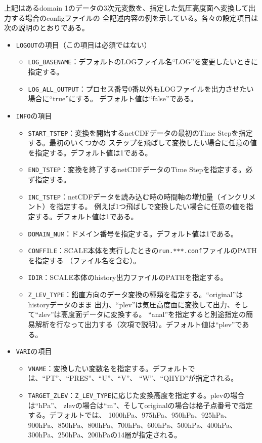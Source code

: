 \noindent 上記はあるdomain 1のデータの3次元変数を、指定した気圧高度面へ変換して出力する場合のconfigファイルの
全記述内容の例を示している。各々の設定項目は次の説明のとおりである。
\begin{itemize}
 \item \verb|LOGOUT|の項目（この項目は必須ではない）
 \begin{itemize}
  \item \verb|LOG_BASENAME|：デフォルトのLOGファイル名``LOG''を変更したいときに指定する。
  \item \verb|LOG_ALL_OUTPUT|：プロセス番号0番以外もLOGファイルを出力させたい場合に``true''にする。
        デフォルト値は``false''である。
 \end{itemize}
 \item \verb|INFO|の項目
 \begin{itemize}
  \item \verb|START_TSTEP|：変換を開始するnetCDFデータの最初のTime Stepを指定する。最初のいくつかの
        ステップを飛ばして変換したい場合に任意の値を指定する。デフォルト値は1である。
  \item \verb|END_TSTEP|：変換を終了するnetCDFデータのTime Stepを指定する。必ず指定する。
  \item \verb|INC_TSTEP|：netCDFデータを読み込む時の時間軸の増加量（インクリメント）を指定する。
        例えば1つ飛ばしで変換したい場合に任意の値を指定する。デフォルト値は1である。
  \item \verb|DOMAIN_NUM|：ドメイン番号を指定する。デフォルト値は1である。
  \item \verb|CONFFILE|：SCALE本体を実行したときの\verb|run.***.conf|ファイルのPATHを指定する
        （ファイル名を含む）。
  \item \verb|IDIR|：SCALE本体のhistory出力ファイルのPATHを指定する。
  \item \verb|Z_LEV_TYPE|：鉛直方向のデータ変換の種類を指定する。``original''はhistoryデータのまま
        出力、``plev''は気圧高度面に変換して出力、そして``zlev''は高度面データに変換する。
        ``anal''を指定すると別途指定の簡易解析を行なって出力する（次項で説明）。デフォルト値は``plev''である。
 \end{itemize}
 \item \verb|VARI|の項目
 \begin{itemize}
  \item \verb|VNAME|：変換したい変数名を指定する。デフォルトでは、``PT''、``PRES''、``U''、``V''、
        ``W''、``QHYD''が指定される。
  \item \verb|TARGET_ZLEV|：\verb|Z_LEV_TYPE|に応じた変換高度を指定する。plevの場合は``hPa''、
        zlevの場合は``m''、そしてoriginalの場合は格子点番号で指定する。デフォルトでは、
        1000hPa、975hPa、950hPa、925hPa、900hPa、850hPa、800hPa、700hPa、600hPa、500hPa、400hPa、
        300hPa、250hPa、200hPaの14層が指定される。 
 \end{itemize}
\end{itemize}

